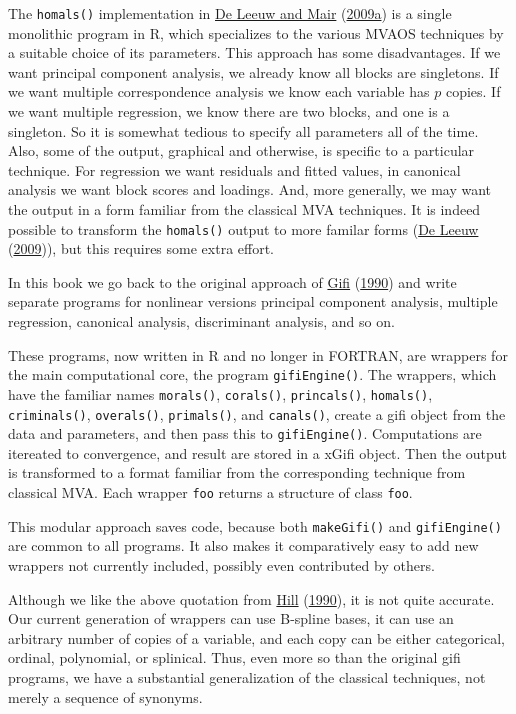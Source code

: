 \documentclass[
  12pt,
]{book}
\begin{document}
The \texttt{homals()} implementation in \protect\hyperlink{ref-deleeuw_mair_A_09a}{De Leeuw and Mair} (\protect\hyperlink{ref-deleeuw_mair_A_09a}{2009a}) is a single monolithic program in R, which specializes to the various MVAOS techniques by a suitable choice of its parameters. This approach has some disadvantages. If we want principal component analysis, we already know all blocks are singletons. If we want multiple correspondence analysis we know each variable has \(p\) copies. If we want multiple regression, we know
there are two blocks, and one is a singleton. So it is somewhat tedious to specify all parameters all of the time. Also, some of the output, graphical and otherwise,
is specific to a particular technique. For regression we want residuals and fitted values, in canonical analysis we want block scores and loadings. And, more generally, we may want the output in a form familiar from the classical MVA techniques. It is indeed possible to transform the \texttt{homals()} output to more familar forms (\protect\hyperlink{ref-deleeuw_R_09c}{De Leeuw} (\protect\hyperlink{ref-deleeuw_R_09c}{2009})), but this requires some extra effort.

In this book we go back to the original approach of \protect\hyperlink{ref-gifi_B_90}{Gifi} (\protect\hyperlink{ref-gifi_B_90}{1990}) and write separate programs for nonlinear versions principal component analysis, multiple regression, canonical analysis, discriminant analysis, and so on.

These programs, now written in R and no longer in FORTRAN, are wrappers for the main computational core, the program \texttt{gifiEngine()}. The wrappers, which have the familiar names \texttt{morals()}, \texttt{corals()}, \texttt{princals()}, \texttt{homals()}, \texttt{criminals()}, \texttt{overals()}, \texttt{primals()}, and \texttt{canals()}, create a gifi object from the data and parameters, and then pass this to \texttt{gifiEngine()}. Computations are itereated to convergence, and result are stored in a xGifi object. Then the output is transformed to a format familiar from the corresponding technique from classical MVA. Each wrapper \texttt{foo} returns a structure of class \texttt{foo}.

This modular approach saves code, because both \texttt{makeGifi()} and \texttt{gifiEngine()} are common to all programs. It
also makes it comparatively easy to add new wrappers not currently included, possibly even contributed by others.

Although we like the above quotation from \protect\hyperlink{ref-hill_90}{Hill} (\protect\hyperlink{ref-hill_90}{1990}), it is not quite accurate. Our current generation of wrappers can use B-spline bases, it can use an arbitrary number of copies of a variable, and each copy can be either categorical, ordinal, polynomial, or splinical. Thus, even more so than the original gifi programs, we have a substantial generalization of the classical techniques, not merely a sequence of synonyms.
\end{document}
